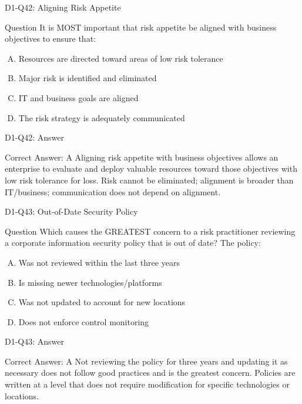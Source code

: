 \documentclass{beamer}
\begin{document}
	\begin{frame}{D1-Q42: Aligning Risk Appetite}
		\begin{block}{Question}
			It is MOST important that risk appetite be aligned with business objectives to ensure that:
		\end{block}
		\begin{enumerate}[(A)]
			\item Resources are directed toward areas of low risk tolerance
			\item Major risk is identified and eliminated
			\item IT and business goals are aligned
			\item The risk strategy is adequately communicated
		\end{enumerate}
	\end{frame}
	\begin{frame}{D1-Q42: Answer}
		\begin{block}{Correct Answer: A}
			Aligning risk appetite with business objectives allows an enterprise to evaluate and deploy valuable resources toward those objectives with low risk tolerance for loss. Risk cannot be eliminated; alignment is broader than IT/business; communication does not depend on alignment.
		\end{block}
	\end{frame}
	
	\begin{frame}{D1-Q43: Out-of-Date Security Policy}
		\begin{block}{Question}
			Which causes the GREATEST concern to a risk practitioner reviewing a corporate information security policy that is out of date? The policy:
		\end{block}
		\begin{enumerate}[(A)]
			\item Was not reviewed within the last three years
			\item Is missing newer technologies/platforms
			\item Was not updated to account for new locations
			\item Does not enforce control monitoring
		\end{enumerate}
	\end{frame}
	\begin{frame}{D1-Q43: Answer}
		\begin{block}{Correct Answer: A}
			Not reviewing the policy for three years and updating it as necessary does not follow good practices and is the greatest concern. Policies are written at a level that does not require modification for specific technologies or locations.
		\end{block}
	\end{frame}
	
\end{document}
